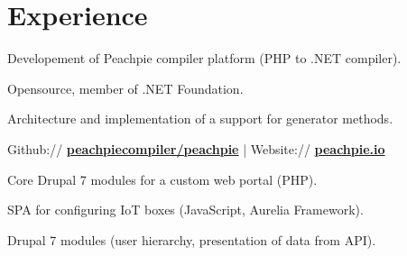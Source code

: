 \documentclass[a4paper]{deedy-resume} %
\begin{document}
%
\begin{minipage}[t]{0.62\textwidth} %


\section{Experience}


\vspace{\topsep} %
\begin{tightitemize}
\item Developement of Peachpie compiler platform (PHP to .NET compiler).
\item Opensource, member of .NET Foundation.
\item Architecture and implementation of a support for generator methods.
\item Github:// \href{https://github.com/peachpiecompiler/peachpie}{\bf peachpiecompiler/peachpie} | Website:// \href{https://www.peachpie.io/}{\bf peachpie.io}
\end{tightitemize}

\sectionspace %



\begin{tightitemize}
\item Core Drupal 7 modules for a custom web portal (PHP).
\item SPA for configuring IoT boxes (JavaScript, Aurelia Framework).
\end{tightitemize}

\begin{tightitemize}
\item Drupal 7 modules (user hierarchy, presentation of data from API).
\end{tightitemize}

\sectionspace %



\end{minipage}
\end{document}
